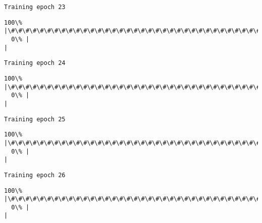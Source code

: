 \documentclass[11pt]{article}
\begin{document}
    \begin{Verbatim}[commandchars=\\\{\}]
Training epoch 23

    \end{Verbatim}

    \begin{Verbatim}[commandchars=\\\{\}]
100\% |\#\#\#\#\#\#\#\#\#\#\#\#\#\#\#\#\#\#\#\#\#\#\#\#\#\#\#\#\#\#\#\#\#\#\#\#\#\#\#\#\#\#\#\#\#\#\#\#\#\#\#\#\#\#\#\#\#\#\#\#\#\#\#\#\#\#\#\#\#\#\#\#|
  0\% |                                                                        |
    \end{Verbatim}

    \begin{Verbatim}[commandchars=\\\{\}]
Training epoch 24

    \end{Verbatim}

    \begin{Verbatim}[commandchars=\\\{\}]
100\% |\#\#\#\#\#\#\#\#\#\#\#\#\#\#\#\#\#\#\#\#\#\#\#\#\#\#\#\#\#\#\#\#\#\#\#\#\#\#\#\#\#\#\#\#\#\#\#\#\#\#\#\#\#\#\#\#\#\#\#\#\#\#\#\#\#\#\#\#\#\#\#\#|
  0\% |                                                                        |
    \end{Verbatim}

    \begin{Verbatim}[commandchars=\\\{\}]
Training epoch 25

    \end{Verbatim}

    \begin{Verbatim}[commandchars=\\\{\}]
100\% |\#\#\#\#\#\#\#\#\#\#\#\#\#\#\#\#\#\#\#\#\#\#\#\#\#\#\#\#\#\#\#\#\#\#\#\#\#\#\#\#\#\#\#\#\#\#\#\#\#\#\#\#\#\#\#\#\#\#\#\#\#\#\#\#\#\#\#\#\#\#\#\#|
  0\% |                                                                        |
    \end{Verbatim}

    \begin{Verbatim}[commandchars=\\\{\}]
Training epoch 26

    \end{Verbatim}

    \begin{Verbatim}[commandchars=\\\{\}]
100\% |\#\#\#\#\#\#\#\#\#\#\#\#\#\#\#\#\#\#\#\#\#\#\#\#\#\#\#\#\#\#\#\#\#\#\#\#\#\#\#\#\#\#\#\#\#\#\#\#\#\#\#\#\#\#\#\#\#\#\#\#\#\#\#\#\#\#\#\#\#\#\#\#|
  0\% |                                                                        |
    \end{Verbatim}
\end{document}
